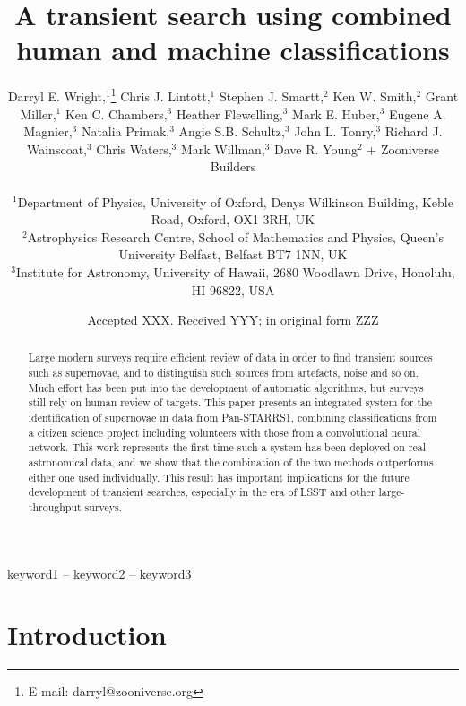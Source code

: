 \documentclass[a4paper,fleqn,usenatbib]{mnras}
\title[Human and machine classifications]{A transient search using combined human and machine classifications}
\author[D. Wright, C. Lintott, K. W. Smith et al.]{Darryl E. Wright,$^{1}$\thanks{E-mail: darryl@zooniverse.org}
Chris J. Lintott,$^{1}$
Stephen J. Smartt,$^{2}$
Ken W. Smith,$^{2}$\newauthor
Grant Miller,$^{1}$
Ken C. Chambers,$^{3}$
Heather Flewelling,$^{3}$
Mark E. Huber,$^{3}$\newauthor
Eugene A. Magnier,$^{3}$
Natalia Primak,$^{3}$
Angie S.B. Schultz,$^{3}$
John L. Tonry,$^{3}$\newauthor
Richard J. Wainscoat,$^{3}$
Chris Waters,$^{3}$
Mark Willman,$^{3}$
Dave R.  Young$^{2}$\newauthor
+ Zooniverse Builders\\
\\
$^{1}$Department of Physics, University of Oxford, Denys Wilkinson Building, Keble Road, Oxford, OX1 3RH, UK \\
$^{2}$Astrophysics Research Centre, School of Mathematics and Physics, Queen’s University Belfast, Belfast BT7 1NN, UK \\
$^{3}$Institute for Astronomy, University of Hawaii, 2680 Woodlawn Drive, Honolulu, HI 96822, USA \\
}
\date{Accepted XXX. Received YYY; in original form ZZZ}
\begin{document}
\label{firstpage}
\pagerange{\pageref{firstpage}--\pageref{lastpage}}
\maketitle

\begin{abstract}
Large modern surveys require efficient review of data in order to find transient sources such as supernovae, and to distinguish such sources from artefacts, noise and so on. Much effort has been put into the development of automatic algorithms, but surveys still rely on human review of targets. This paper presents an integrated system for the identification of supernovae in data from Pan-STARRS1, combining classifications from a citizen science project including volunteers with those from a convolutional neural network. This work represents the first time such a system has been deployed on real astronomical data, and we show that the combination of the two methods outperforms either one used individually. This result has important implications for the future development of transient searches, especially in the era of LSST and other large-throughput surveys. 
\end{abstract}

\begin{keywords}
keyword1 -- keyword2 -- keyword3
\end{keywords}



\section{Introduction}
\end{document}

